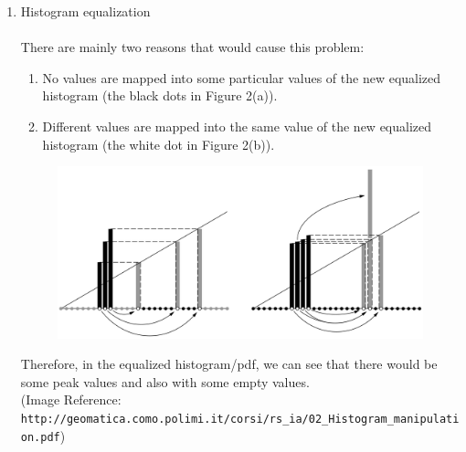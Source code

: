 \documentclass{article}
\begin{document}
\begin{enumerate}[label=A\arabic*)]
\begin{enumerate}[label=(\alph*)]
\begin{figure}[h!]
		            \captionsetup{justification=centering}
		        \end{figure}
		\end{enumerate} 
	\pagebreak
	\item Histogram equalization
		\\
		\\
		There are mainly two reasons that would cause this problem:
		\begin{enumerate}[label=\arabic*)]
			\item No values are mapped into some particular values of the new equalized histogram (the black dots in Figure 2(a)).
			\item Different values are mapped into the same value of the new equalized histogram (the white dot in Figure 2(b)).
		\end{enumerate}
		\begin{figure}[h!]
            \centering
            \includegraphics[width=\linewidth]{img-5.png}
            \captionsetup{justification=centering}
        \end{figure}
        Therefore, in the equalized histogram/pdf, we can see that there would be some peak values and also with some empty values. \\
        
        (Image Reference: \texttt{http://geomatica.como.polimi.it/corsi/rs\_ia/02\_Histogram\_manipulation.pdf})
\end{enumerate}
\pagebreak
\end{document}
